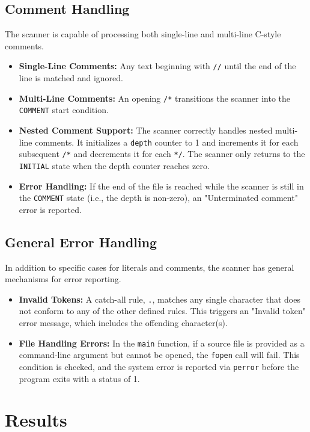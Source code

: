 \documentclass[12pt,a4paper]{article}
\begin{document}
\subsection{Comment Handling}
The scanner is capable of processing both single-line and multi-line C-style comments.
\begin{itemize}
    \item \textbf{Single-Line Comments:} Any text beginning with \texttt{//} until the end of the line is matched and ignored.
    \item \textbf{Multi-Line Comments:} An opening \texttt{/*} transitions the scanner into the \texttt{COMMENT} start condition.
    \item \textbf{Nested Comment Support:} The scanner correctly handles nested multi-line comments. It initializes a \texttt{depth} counter to 1 and increments it for each subsequent \texttt{/*} and decrements it for each \texttt{*/}. The scanner only returns to the \texttt{INITIAL} state when the depth counter reaches zero.
    \item \textbf{Error Handling:} If the end of the file is reached while the scanner is still in the \texttt{COMMENT} state (i.e., the depth is non-zero), an "Unterminated comment" error is reported.
\end{itemize}

\subsection{General Error Handling}
In addition to specific cases for literals and comments, the scanner has general mechanisms for error reporting.
\begin{itemize}
    \item \textbf{Invalid Tokens:} A catch-all rule, \texttt{.}, matches any single character that does not conform to any of the other defined rules. This triggers an "Invalid token" error message, which includes the offending character(s).
    \item \textbf{File Handling Errors:} In the \texttt{main} function, if a source file is provided as a command-line argument but cannot be opened, the \texttt{fopen} call will fail. This condition is checked, and the system error is reported via \texttt{perror} before the program exits with a status of 1.
\end{itemize}
\vspace{5cm}

\section{Results}
\end{document}
